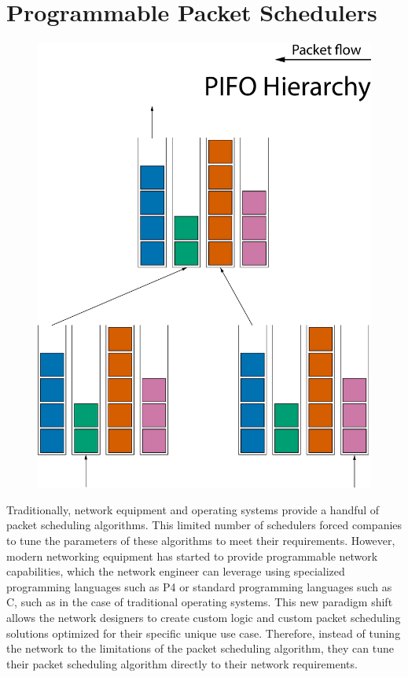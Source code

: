 \documentclass[sigconf, nonacm]{acmart}
\begin{document}
%
%


\section{Programmable Packet Schedulers}

\begin{figure}
  \includegraphics[width=0.3\linewidth]{pifo-hierarchy.pdf}
  \caption{\label{fig:pifo_hierarchy}}
\end{figure}

Traditionally, network equipment and operating systems provide a handful of packet scheduling algorithms. This limited number of schedulers forced companies to tune the parameters of these algorithms to meet their requirements. However, modern networking equipment has started to provide programmable network capabilities, which the network engineer can leverage using specialized programming languages such as P4\cite{p4} or standard programming languages such as C, such as in the case of traditional operating systems. This new paradigm shift allows the network designers to create custom logic and custom packet scheduling solutions optimized for their specific unique use case. Therefore, instead of tuning the network to the limitations of the packet scheduling algorithm, they can tune their packet scheduling algorithm directly to their network requirements.
\end{document}
